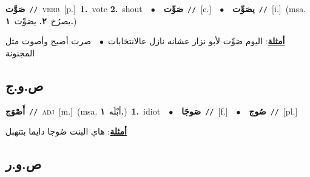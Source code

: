 \documentclass[10pt,a4paper,twoside]{article} %
\begin{document}
\begin{multicols}{2}
{\setlength\topsep{0pt}\textbf{\foreignlanguage{arabic}{صَوَّت}}\ {\color{gray}\texttt{//}\color{black}}\ \textsc{verb}\ [p.]\ \textbf{1.}~vote  \textbf{2.}~shout\ \ $\bullet$\ \ \setlength\topsep{0pt}\textbf{\foreignlanguage{arabic}{صَوِّت}}\ {\color{gray}\texttt{//}\color{black}}\ [c.]\ \ $\bullet$\ \ \setlength\topsep{0pt}\textbf{\foreignlanguage{arabic}{يصَوِّت}}\ {\color{gray}\texttt{//}\color{black}}\ [i.]\ \color{gray}(msa. \foreignlanguage{arabic}{يصرُخ}~\foreignlanguage{arabic}{\textbf{٢.}}  \foreignlanguage{arabic}{يصَوِّت}~\foreignlanguage{arabic}{\textbf{١.}})\color{black}\  \begin{flushright}\color{gray}\foreignlanguage{arabic}{\textbf{\underline{\foreignlanguage{arabic}{أمثلة}}}: اليوم صَوِّت لأبو نزار عشانه نازل عالانتخابات\ $\bullet$\ \  صرت أصيح وأصوت مثل المجنونة}\end{flushright}\color{black}} \vspace{2mm}

\vspace{-3mm}
\subsection*{\color{blue}\foreignlanguage{arabic}{ص.و.ج}\color{blue}{}} 

{\setlength\topsep{0pt}\textbf{\foreignlanguage{arabic}{أَصْوَج}}\ {\color{gray}\texttt{//}\color{black}}\ \textsc{adj}\ [m.]\ \color{gray}(msa. \foreignlanguage{arabic}{أبْلَه}~\foreignlanguage{arabic}{\textbf{١.}})\color{black}\ \textbf{1.}~idiot\ \ $\bullet$\ \ \setlength\topsep{0pt}\textbf{\foreignlanguage{arabic}{صَوجَا}}\ {\color{gray}\texttt{//}\color{black}}\ [f.]\ \ $\bullet$\ \ \setlength\topsep{0pt}\textbf{\foreignlanguage{arabic}{صُوج}}\ {\color{gray}\texttt{//}\color{black}}\ [pl.]\  \begin{flushright}\color{gray}\foreignlanguage{arabic}{\textbf{\underline{\foreignlanguage{arabic}{أمثلة}}}: هاي البنت صُوجا دايما بتتهبل}\end{flushright}\color{black}} \vspace{2mm}

\vspace{-3mm}
\subsection*{\color{blue}\foreignlanguage{arabic}{ص.و.ر}\color{blue}{}} 


\end{multicols}
\end{document}
